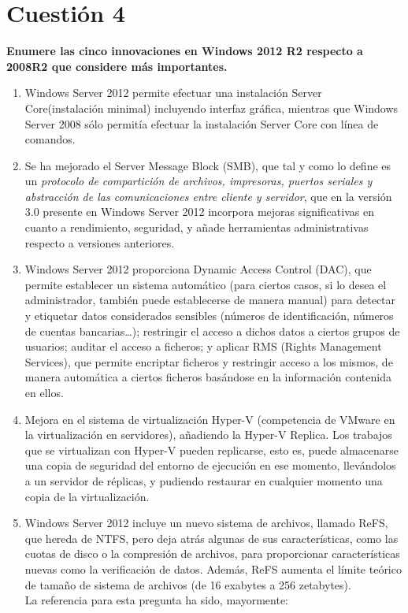 \documentclass[a4paper,11pt]{article}
\newenvironment{answer}{%
\begin{list}{}{%
}%
\item[]}{\end{list}}
\begin{document}
\section{Cuestión 4}
\textbf{Enumere las cinco innovaciones en Windows 2012 R2 respecto a 2008R2 que considere más importantes.}
\begin{answer}
\begin{enumerate}
 \item \cite{smbi} Windows Server 2012 permite efectuar una instalación Server Core(instalación minimal) incluyendo interfaz gráfica,
 mientras que Windows Server 2008 sólo permitía efectuar la instalación Server Core con línea de comandos.
 
 \item Se ha mejorado el Server Message Block (SMB), que tal y como lo define \cite{smb} es un 
 \textit{protocolo de compartición de archivos, impresoras, puertos seriales y abstracción de las comunicaciones entre 
 cliente y servidor}, que en la versión 3.0 presente en Windows Server 2012 incorpora mejoras significativas en cuanto a 
 rendimiento, seguridad, y añade herramientas administrativas respecto a versiones anteriores.
 
 \item \cite{dac}Windows Server 2012 proporciona Dynamic Access Control (DAC), que permite establecer un sistema automático (para
 ciertos casos, si lo desea el administrador, también puede establecerse de manera manual) para detectar y etiquetar
 datos considerados sensibles (números de identificación, números de cuentas bancarias\ldots); restringir el acceso a
 dichos datos a ciertos grupos de usuarios; auditar el acceso a ficheros; y aplicar RMS (Rights Management Services), que permite
 encriptar ficheros y restringir acceso a los mismos, de manera automática a ciertos ficheros basándose en la información contenida en ellos.
 
 \item Mejora en el sistema de virtualización Hyper-V (competencia de VMware en la virtualización en servidores),
 añadiendo la Hyper-V Replica. Los trabajos que se virtualizan con Hyper-V pueden replicarse, esto es, puede almacenarse
 una copia de seguridad del entorno de ejecución en ese momento, llevándolos a un servidor de réplicas, y pudiendo
 restaurar en cualquier momento una copia de la virtualización.
 
 \item Windows Server 2012 incluye un nuevo sistema de archivos, llamado ReFS, que hereda de NTFS, pero deja atrás
 algunas de sus características, como las cuotas de disco o la compresión de archivos, para proporcionar características
 nuevas como la verificación de datos. Además, ReFS aumenta el límite teórico de tamaño de sistema de archivos (de 16
 exabytes a 256 zetabytes).\\
 
 La referencia para esta pregunta ha sido, mayormente: \cite{techr}	
\end{enumerate}
\end{answer}
\end{document}
